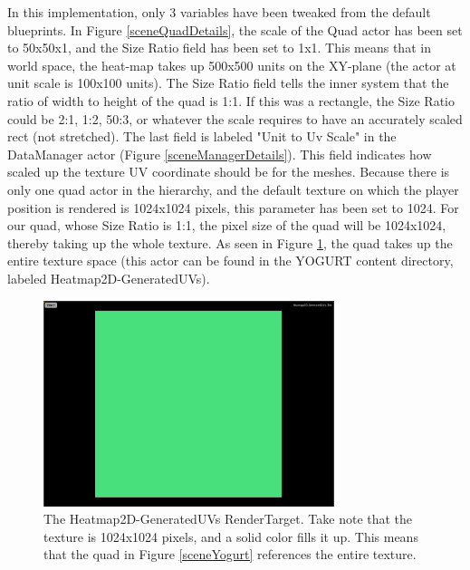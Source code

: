 \documentclass[journal]{IEEEtran}
\begin{document}
In this implementation, only 3 variables have been tweaked from the default blueprints. In Figure \ref{sceneQuadDetails}, the scale of the Quad actor has been set to 50x50x1, and the Size Ratio field has been set to 1x1. This means that in world space, the heat-map takes up 500x500 units on the XY-plane (the actor at unit scale is 100x100 units). The Size Ratio field tells the inner system that the ratio of width to height of the quad is 1:1. If this was a rectangle, the Size Ratio could be 2:1, 1:2, 50:3, or whatever the scale requires to have an accurately scaled rect (not stretched). The last field is labeled "Unit to Uv Scale" in the DataManager actor (Figure \ref{sceneManagerDetails}). This field indicates how scaled up the texture UV coordinate should be for the meshes. Because there is only one quad actor in the hierarchy, and the default texture on which the player position is rendered is 1024x1024 pixels, this parameter has been set to 1024. For our quad, whose Size Ratio is 1:1, the pixel size of the quad will be 1024x1024, thereby taking up the whole texture. As seen in Figure \ref{generatedUVs}, the quad takes up the entire texture space (this actor can be found in the YOGURT content directory, labeled Heatmap2D-GeneratedUVs).

\begin{figure}[ht]
\includegraphics[width=8.5cm]{"generatedUVs"}
\caption{The Heatmap2D-GeneratedUVs RenderTarget. Take note that the texture is 1024x1024 pixels, and a solid color fills it up. This means that the quad in Figure \ref{sceneYogurt} references the entire texture.}
\label{generatedUVs}
\end{figure}
\end{document}
